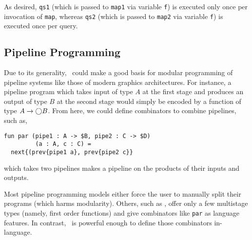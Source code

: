 As desired, \texttt{qs1} (which is passed to \texttt{map1} via variable \texttt{f}) is executed only once per invocation of \texttt{map},
whereas \texttt{qs2} (which is passed to \texttt{map2} via variable \texttt{f}) is executed once per query.

\subsection {Pipeline Programming}

Due to its generality, \lang\ could make a good basis for modular programming of pipeline systems like those of modern graphics architectures.
For instance, a pipeline program which takes input of type $A$ at the first stage and produces an output of type $B$ at the second stage 
would simply be encoded by a function of type $A \to \bigcirc B$.
From here, we could define combinators to combine pipelines, such as,
\begin{lstlisting} 
fun par (pipe1 : A -> $B, pipe2 : C -> $D) 
         (a : A, c : C) = 
  next{(prev{pipe1 a}, prev{pipe2 c}}
\end{lstlisting}
which takes two pipelines makes a pipeline on the products of their inputs and outputs.

Most pipeline programming models either force the user to manually split their programs (which harms modularity).
Others, such as \cite{Foley:2011}, offer only a few multistage types (namely, first order functions) and give 
combinators like \texttt{par} as language features.
In contrast, \lang\ is powerful enough to define those combinators in-language.